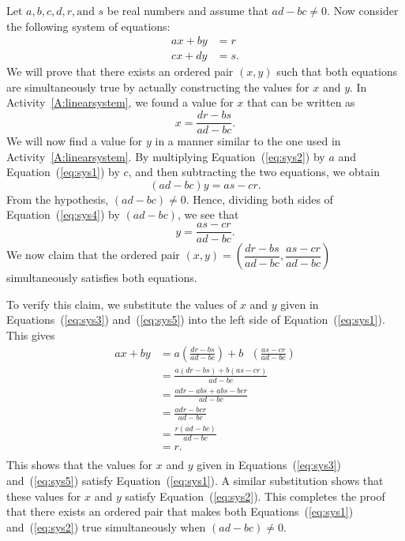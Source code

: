 \begin{myproof}
Let  $a,b,c,d,r,\text{and }s$ be real numbers and assume that  $ad - bc \ne 0$.  Now consider the following system of equations:
\begin{align}
ax + by &= r \label{eq:sys1} \\
cx + dy &= s.  \label{eq:sys2}
\end{align}
%
We will prove that there exists an ordered pair $\left( x, y \right)$ such that both equations are simultaneously true by actually constructing the values for $x$ and $y$.  
In Activity~\ref{A:linearsystem}, we found a value for $x$ that can be written as
\begin{equation}
x = \frac{{dr - bs}}{{ad - bc}}. \label{eq:sys3}
\end{equation}
%
We will now find a value for $y$ in a manner similar to the one used in 
Activity~\ref{A:linearsystem}.  By multiplying Equation~(\ref{eq:sys2}) by $a$ and Equation~(\ref{eq:sys1}) by $c$, and then subtracting the two equations, we obtain
\begin{equation}
\left( {ad - bc} \right)y = as - cr. \label{eq:sys4}
\end{equation}
%
From the hypothesis, $\left( {ad - bc} \right) \ne 0$.  Hence, dividing both sides of 
Equation~(\ref{eq:sys4}) by $\left( {ad - bc} \right)$, we see that
%
\begin{equation}
y = \frac{{as - cr}}{{ad - bc}}. \label{eq:sys5}
\end{equation}
%
We now claim that the ordered pair 
$\left( x, y \right) = \left(\dfrac{{dr - bs}}{{ad - bc}}, \dfrac{{as - cr}}{{ad - bc}} \right)$ simultaneously satisfies both equations.

To verify this claim, we substitute the values of $x$ and $y$ given in Equations~(\ref{eq:sys3}) and~(\ref{eq:sys5}) into the left side of Equation~(\ref{eq:sys1}).  This gives
\[
\begin{aligned}
  ax + by &= a \left( {\frac{{dr - bs}}{{ad - bc}}} \right) + b\text{ }\left( {\frac{{as - cr}}{{ad - bc}}} \right) \\ 
   &= \frac{{a(dr - bs) + b(as - cr)}}{{ad - bc}} \\ 
   &= \frac{{adr - abs + abs - bcr}}{{ad - bc}} \\ 
   &= \frac{{adr - bcr}}{{ad - bc}} \\ 
   &= \frac{{r(ad - bc)}}{{ad - bc}} \\ 
   &= r. \\ 
\end{aligned} 
\]
%
This shows that the values for $x$ and $y$ given in Equations~(\ref{eq:sys3}) and~(\ref{eq:sys5}) satisfy Equation~(\ref{eq:sys1}).  A similar substitution shows that these values for $x$ and $y$ satisfy Equation~(\ref{eq:sys2}).  This completes the proof that there exists an ordered pair that makes both Equations~(\ref{eq:sys1}) and~(\ref{eq:sys2}) true simultaneously when 
$\left( {ad - bc} \right) \ne 0$.
\end{myproof}
\hbreak
%
